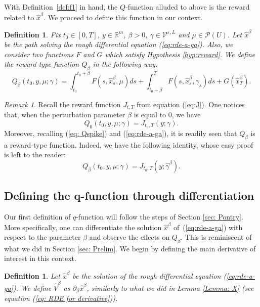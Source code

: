 \documentclass[12pt,reqno]{amsart}
\numberwithin{equation}{section}  %
\newcommand{\1}{{\bf 1}}
\newcommand{\2}{{\bf 2}}
\newcommand{\R}{\mathbb R}
\newcommand{\ga}{\gamma}
\newtheorem{definition}[theorem]{Definition}
\theoremstyle{remark}
\newtheorem{remark}[theorem]{Remark}
\theoremstyle{remark}
\newcommand{\beq}{\begin{equation}}
\newcommand{\eeq}{\end{equation}}
\begin{document}
With Definition~\ref{def:f1} in hand, the $Q$-function alluded to above is the reward related to $\hat{x}^{\beta}$. We proceed to define this function in our context.
\begin{definition}\label{def: perturbed-dynamics}Fix $t_0\in [0,T]$, $y\in \R^{m}$, $\beta>0$, $\ga \in \mathcal{V}^{\varepsilon,L}$ and {$\mu \in \mathcal{P}(U)$}. Let $\hat{x}^{\beta}$ be the path solving the rough differential equation (\ref{eq:rde-a-ga}). Also, we consider two functions $F$ and $G$ which satisfy Hypothesis \ref{hyp:reward}. We define the reward-type function $Q_{\beta}$ in the following way:
\beq\label{eq:Q}
Q_{\beta}(t_0,y,\mu;\ga) = \int_{t_0}^{t_0+\beta} F(s, \hat{x}^{\beta}_{s}, \mu) ds + \int_{t_0+\beta}^T F(s, \hat{x}^{\beta}_{s}, \ga_s) ds + G(\hat{x}^{\beta}_{T}).
\eeq
\end{definition}

\begin{remark}\label{rem: zero-perturb}
    Recall the reward function $J_{t,T}$ from equation (\ref{eq:J}). One notices that, when the perturbation parameter $\beta$ is equal to 0, we have
    \begin{equation}
        Q_{0}(t_0,y,\mu;\ga)=J_{t_0,T}(y;\ga).
    \end{equation}
Moreover, recalling (\ref{eq: Qspike}) and (\ref{eq:rde-a-ga}), it is readily seen that $Q_{\beta}$ is a reward-type function. Indeed, we have the following identity, whose easy proof is left to the reader:
    \begin{equation}
        Q_{\beta}(t_0,y,\mu;\ga)=J_{t_0,T}(y;\hat{\ga}^{\beta}).
    \end{equation}
    \end{remark}
    
\subsection{Defining the $\mathbf{q}$-function through differentiation}\label{sec:q-function}
Our first definition of $q$-function will follow the steps of Section \ref{sec: Pontry}. More specifically, one can differentiate the solution $\hat{x}^{\beta}$ of~(\ref{eq:rde-a-ga}) with respect to the parameter $\beta$ and observe the effects on $Q_{\beta}$. This is reminiscent of what we did in Section \ref{sec: Prelim}. We begin by defining the main derivative of interest in this context.

\begin{definition}\label{def: hat-deriv}
    Let $\hat{x}^{\beta}$ be the solution of the rough differential equation (\ref{eq:rde-a-ga}). We define $\widehat
{V}^{\beta}$ as $\partial_{\beta}\hat{x}^{\beta}$, similarly to what we did in Lemma \ref{Lemma: X} (see equation (\ref{eq: RDE for derivative})).
\end{definition}
\end{document}
